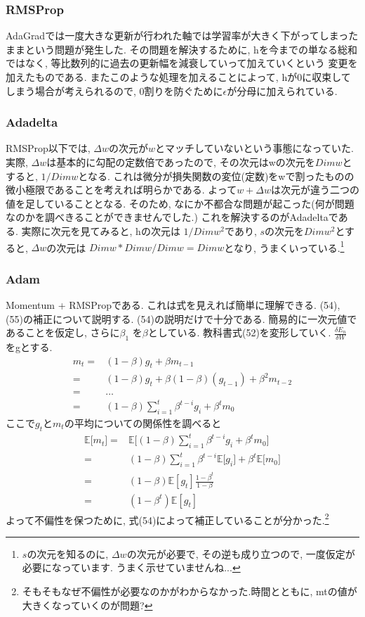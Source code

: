 \documentclass[a4paper,11pt]{jsarticle}
\begin{document}
\subsubsection*{RMSProp}
AdaGradでは一度大きな更新が行われた軸では学習率が大きく下がってしまったままという問題が発生した.
その問題を解決するために, hを今までの単なる総和ではなく, 等比数列的に過去の更新幅を減衰していって加えていくという
変更を加えたものである. またこのような処理を加えることによって, hが0に収束してしまう場合が考えられるので, 
0割りを防ぐために$\epsilon$が分母に加えられている.
\subsubsection*{Adadelta}
RMSProp以下では, $\Delta w$の次元が$w$とマッチしていないという事態になっていた.
実際, $\Delta w$は基本的に勾配の定数倍であったので, その次元はwの次元を$Dimw$とすると, 
$1/Dimw$となる. 
これは微分が損失関数の変位(定数)をwで割ったものの微小極限であることを考えれば明らかである.
よって$w + \Delta w$は次元が違う二つの値を足していることとなる.
そのため, なにか不都合な問題が起こった(何が問題なのかを調べきることができませんでした.)
これを解決するのがAdadeltaである. 実際に次元を見てみると, 
hの次元は $1 / Dimw^2$であり, $s$の次元を$Dimw^2$とすると, $\Delta w$の次元は
$Dimw * Dimw / Dimw = Dimw$となり, うまくいっている.\footnote{$s$の次元を知るのに, $\Delta w$の次元が必要で, 
その逆も成り立つので, 一度仮定が必要になっています. うまく示せていませんね...}
\subsubsection*{Adam}
Momentum + RMSPropである. これは式を見えれば簡単に理解できる.
(54), (55)の補正について説明する.
(54)の説明だけで十分である. 簡易的に一次元値であることを仮定し, さらに$\beta_1$
を$\beta $としている. 教科書式(52)を変形していく.
$\frac{\delta E_n}{\delta W}$ をgとする.
\begin{align*}
  m_t = & (1 - \beta)g_t + \beta m_{t-1}  \\
      = & (1 - \beta)g_t + \beta (1 - \beta)(g_{t-1}) + \beta^2 m_{t-2} \\
      = & \dots \\
      = & (1 - \beta)\sum_{i=1}^{t}\beta^{t-i}g_i + \beta^{t}m_{0}
\end{align*}
ここで$g_t$と$m_t$の平均についての関係性を調べると
\begin{align*}
  \mathbb{E}\lbrack m_t \rbrack = & \mathbb{E}\lbrack (1 - \beta)\sum_{i=1}^{t}\beta^{t-i}g_i + \beta^{t}m_{0} \rbrack \\
  = & (1-\beta)\sum_{i=1}^{t}\beta^{t-i}\mathbb{E}\lbrack g_i \rbrack + \beta^t\mathbb{E}\lbrack m_0 \rbrack \\
  = & (1 - \beta)\mathbb{E}[g_t]\frac{1-\beta^t}{1-\beta} \\
  = & (1 - \beta^t)\mathbb{E}[g_t]
\end{align*}
よって不偏性を保つために, 式(54)によって補正していることが分かった.\footnote{そもそもなぜ不偏性が必要なのかがわからなかった.時間とともに, mtの値が大きくなっていくのが問題?}
\end{document}
